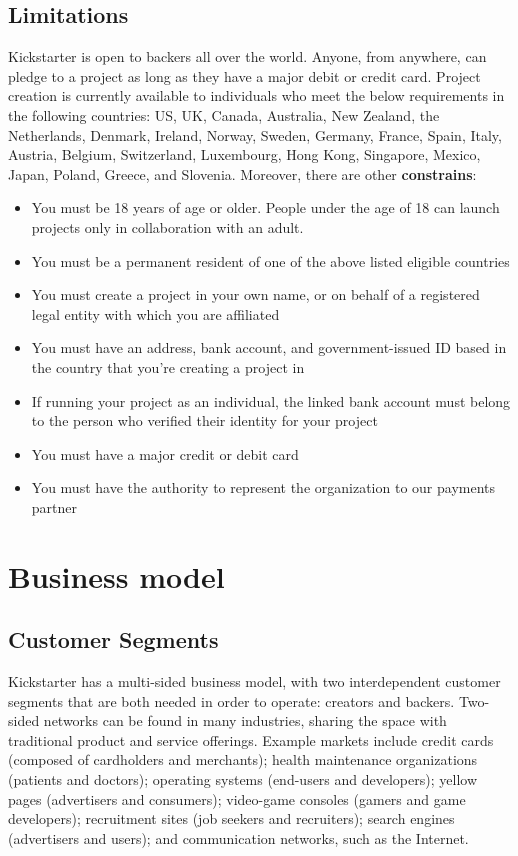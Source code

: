 \documentclass{report}
\begin{document}
\section{Limitations}
Kickstarter is open to backers all over the world. Anyone, from anywhere, can pledge to a project as long as they have a major debit or credit card.
Project creation is currently available to individuals who meet the below requirements in the following countries: US, UK, Canada, Australia, New Zealand, the Netherlands, Denmark, Ireland, Norway, Sweden, Germany, France, Spain, Italy, Austria, Belgium, Switzerland, Luxembourg, Hong Kong, Singapore, Mexico, Japan, Poland, Greece, and Slovenia.
Moreover, there are other \textbf{constrains}:
\begin{itemize}
\item You must be 18 years of age or older. People under the age of 18 can launch projects only in collaboration with an adult.
\item You must be a permanent resident of one of the above listed eligible countries
\item You must create a project in your own name, or on behalf of a registered legal entity with which you are affiliated
\item You must have an address, bank account, and government-issued ID based in the country that you're creating a project in
\item If running your project as an individual, the linked bank account must belong to the person who verified their identity for your project
\item You must have a major credit or debit card
\item You must have the authority to represent the organization to our payments partner
\end{itemize}

\chapter{Business model}\label{businessmodel}
\section{Customer Segments}\label{customerseg}
Kickstarter has a multi-sided business model, with two interdependent customer segments that are both needed in order to operate: creators and backers. Two-sided networks can be found in many industries, sharing the space with traditional product and service offerings. Example markets include credit cards (composed of cardholders and merchants); health maintenance organizations (patients and doctors); operating systems (end-users and developers); yellow pages (advertisers and consumers); video-game consoles (gamers and game developers); recruitment sites (job seekers and recruiters); search engines (advertisers and users); and communication networks, such as the Internet.
\end{document}
